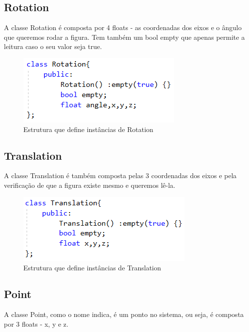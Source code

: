 \documentclass[a4paper]{article}
\begin{document}
\newpage

\subsection{Rotation}
\label{sec:rotation}

A classe Rotation é composta por 4 floats - as coordenadas dos eixos e o ângulo que queremos rodar a figura. Tem também um bool empty que apenas permite a leitura caso o seu valor seja true.

\begin{figure}[H]
\centering
\includegraphics[scale=0.8]{rotation.png}
\caption{Estrutura que define instâncias de Rotation}
\label{img:Rotation}
\end{figure}


\subsection{Translation}
\label{sec:translation}

A classe Translation é também composta pelas 3 coordenadas dos eixos e pela verificação de que a figura existe mesmo e queremos lê-la.

\begin{figure}[H]
\centering
\includegraphics[scale=0.8]{translation.png}
\caption{Estrutura que define instâncias de Translation}
\label{img:Tree}
\end{figure}


\subsection{Point}
\label{sec:point}

A classe Point, como o nome indica, é um ponto no sistema, ou seja, é composta por 3 floats - x, y e z.
\end{document}
